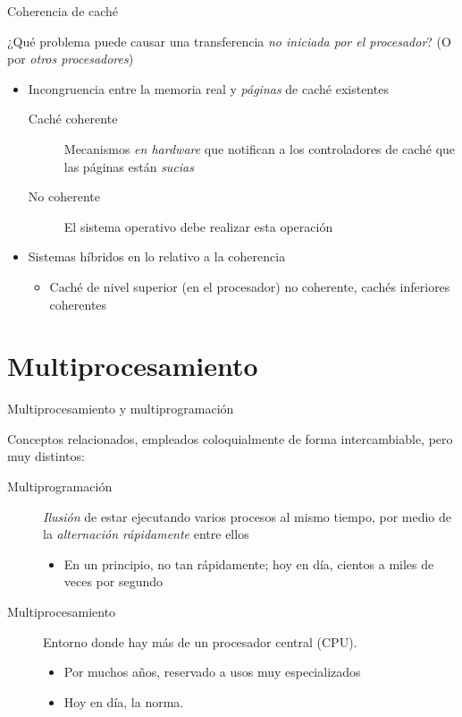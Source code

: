 \documentclass[presentation]{beamer}
\begin{document}
\begin{frame}[label={sec:org1b3e29a}]{Coherencia de caché}
\begin{center}
¿Qué problema puede causar una transferencia \emph{no iniciada por el
procesador}? (O por \emph{otros procesadores})
\end{center}
\pause
\begin{itemize}
\item Incongruencia entre la memoria real y \emph{páginas} de caché existentes
\begin{description}
\item[{Caché coherente}] Mecanismos \emph{en hardware} que notifican a los
controladores de caché que las páginas están \emph{sucias}
\item[{No coherente}] El sistema operativo debe realizar esta operación
\end{description}
\item Sistemas híbridos en lo relativo a la coherencia
\begin{itemize}
\item Caché de nivel superior (en el procesador) no coherente, cachés
inferiores coherentes
\end{itemize}
\end{itemize}
\end{frame}

\section{Multiprocesamiento}
\label{sec:orgabd4947}
\begin{frame}[label={sec:org3bd5cd8}]{Multiprocesamiento y multiprogramación}
\begin{center}
Conceptos relacionados, empleados coloquialmente de forma
intercambiable, pero muy distintos:
\end{center}
\begin{description}
\item[{Multiprogramación}] \emph{Ilusión} de estar ejecutando varios procesos
al mismo tiempo, por medio de la \emph{alternación rápidamente} entre
ellos
\begin{itemize}
\item En un principio, no tan rápidamente; hoy en día, cientos a
miles de veces por segundo
\end{itemize}
\item[{Multiprocesamiento}] Entorno donde hay más de un procesador central
(CPU).
\begin{itemize}
\item Por muchos años, reservado a usos muy especializados
\item Hoy en día, la norma.
\end{itemize}
\end{description}
\end{frame}
\end{document}

